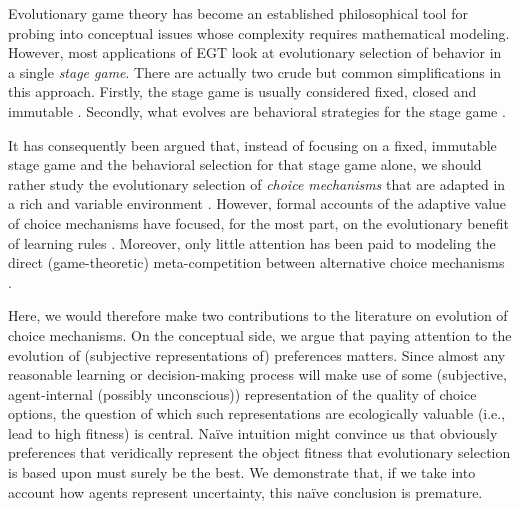 \documentclass[fleqn,reqno,11pt]{article}
\begin{document}

Evolutionary game theory has become an established philosophical tool for probing into
conceptual issues whose complexity requires mathematical modeling. However, most applications
of EGT look at evolutionary selection of behavior in a single \emph{stage game}. There are
actually two crude but common simplifications in this approach. Firstly, the stage game is
usually considered fixed, closed and immutable \citep[there are exceptions, of course, such
as][]{WordenLevin2007:Evolutionary-es, McKenzie-AlexanderSkymrs2012:Inventing-New-S}. Secondly,
what evolves are behavioral strategies for the stage game \citep[what][call the ``behavioral
gamit'']{FawcettHamblin2013:Exposing-the-be}.

It has consequently been argued that, instead of focusing on a fixed, immutable stage game and
the behavioral selection for that stage game alone, we should rather study the evolutionary
selection of \emph{choice mechanisms} that are adapted in a rich and variable environment
\citep[e.g.][]{FawcettHamblin2013:Exposing-the-be,McNamara2013:Towards-a-Riche}. However,
formal accounts of the adaptive value of choice mechanisms have focused, for the most part, on
the evolutionary benefit of learning rules
\citep[e.g.][]{ZollmanSmead2010:Plasticity-and-,SmeadZollman2013:The-Stability-o}.   Moreover, only little attention has been paid to
modeling the direct (game-theoretic) meta-competition between alternative choice mechanisms
\citep[see][for related criticism]{FawcettHamblin2013:Exposing-the-be}.

Here, we would therefore make two contributions to the literature on evolution of choice
mechanisms. On the conceptual side, we argue that paying attention to the evolution of
(subjective representations of) preferences matters. Since almost any reasonable learning or
decision-making process will make use of some (subjective, agent-internal (possibly
unconscious)) representation of the quality of choice options, the question of which such
representations are ecologically valuable (i.e., lead to high fitness) is central. Na\"ive
intuition might convince us that obviously preferences that veridically represent the object
fitness that evolutionary selection is based upon must surely be the best. We demonstrate that,
if we take into account how agents represent uncertainty, this na\"ive conclusion is premature.
\end{document}
